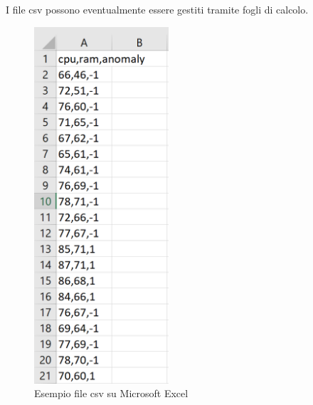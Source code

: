	\mbox{}
	I file csv possono eventualmente essere gestiti tramite fogli di calcolo.
	\mbox{}
	\begin{figure} [H]
		\begin{center}
			\includegraphics[width=50mm]{./img/csv2.png}
		\end{center}
		\caption{Esempio file csv su Microsoft Excel}
	\end{figure}
	\mbox{} 